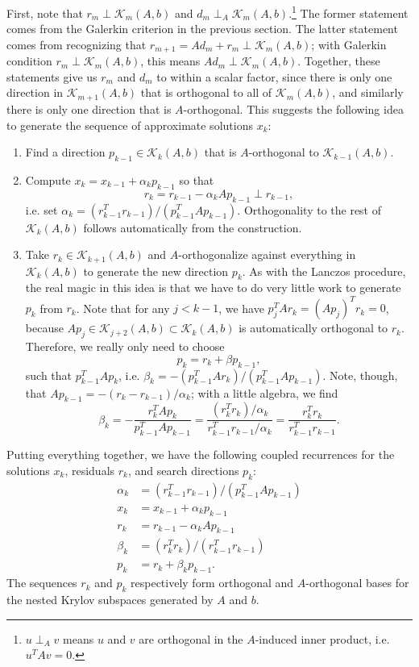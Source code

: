 \documentclass[12pt, leqno]{article} %
\newcommand{\calK}{\mathcal{K}}
\begin{document}
First, note that $r_m \perp \calK_{m}(A,b)$ and $d_m \perp_A
\calK_{m}(A,b)$.\footnote{
  $u \perp_A v$ means $u$ and $v$ are orthogonal
  in the $A$-induced inner product, i.e. $u^T A v = 0$.
}  The former statement comes from the Galerkin
criterion in the previous section.  The latter statement comes from
recognizing that $r_{m+1} = Ad_m + r_m \perp \calK_{m}(A,b)$; with
Galerkin condition $r_m \perp \calK_{m}(A,b)$, this means $Ad_m \perp
\calK_{m}(A,b)$.  Together, these statements give us $r_m$ and $d_m$
to within a scalar factor, since there is only one direction in
$\calK_{m+1}(A,b)$ that is orthogonal to all of $\calK_{m}(A,b)$, and
similarly there is only one direction that is $A$-orthogonal.
This suggests the following idea to generate the sequence of
approximate solutions $x_k$:
\begin{enumerate}
\item
  Find a direction $p_{k-1} \in \calK_{k}(A,b)$ that is $A$-orthogonal
  to $\calK_{k-1}(A,b)$.
\item
  Compute $x_{k} = x_{k-1} + \alpha_k p_{k-1}$ so that
  \[
    r_k = r_{k-1} - \alpha_k A p_{k-1} \perp r_{k-1},
  \]
  i.e. set $\alpha_k = (r_{k-1}^T r_{k-1}) / (p_{k-1}^T A p_{k-1})$.
  Orthogonality to the rest of $\calK_{k}(A,b)$ follows
  automatically from the construction.
\item
  Take $r_k \in \calK_{k+1}(A,b)$ and $A$-orthogonalize against
  everything in $\calK_{k}(A,b)$ to generate the new direction $p_k$.
  As with the Lanczos procedure, the real magic in this idea is that
  we have to do very little work to generate $p_k$ from $r_k$.
  Note that for any $j < k-1$, we have $p_j^T A r_k = (Ap_j)^T r_k = 0$,
  because $Ap_j \in \calK_{j+2}(A,b) \subset \calK_k(A,b)$ is automatically
  orthogonal to $r_k$.  Therefore, we really only need to choose
  \[
    p_k = r_k + \beta p_{k-1},
  \]
  such that $p_{k-1}^T A p_k$, i.e.
  $\beta_k = -(p_{k-1}^T A r_k)/(p_{k-1}^T A p_{k-1})$.
  Note, though, that $Ap_{k-1} = -(r_{k}-r_{k-1})/\alpha_k$;
  with a little algebra, we find
  \[
    \beta_k = -\frac{r_k^T Ap_k}{p_{k-1}^T A p_{k-1}}
            = \frac{(r_k^T r_k)/\alpha_k}{r_{k-1}^T r_{k-1}/\alpha_k}
            = \frac{r_k^T r_k}{r_{k-1}^T r_{k-1}}.
  \]
\end{enumerate}

Putting everything together, we have the following coupled recurrences
for the solutions $x_k$, residuals $r_k$, and search directions $p_k$:
\begin{align*}
  \alpha_k &= (r_{k-1}^T r_{k-1})/(p_{k-1}^T A p_{k-1}) \\
  x_{k} &= x_{k-1} + \alpha_k p_{k-1} \\
  r_{k} &= r_{k-1} - \alpha_k A p_{k-1} \\
  \beta_{k} &= (r_k^T r_k)/(r_{k-1}^T r_{k-1}) \\
  p_k &= r_{k} + \beta_k p_{k-1}.
\end{align*}
The sequences $r_k$ and $p_k$ respectively form orthogonal and $A$-orthogonal
bases for the nested Krylov subspaces generated by $A$ and $b$.
\end{document}
